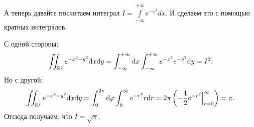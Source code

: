 \begin{Examples}
А теперь давайте посчитаем интеграл $I = \int\limits_{-\infty}^{+\infty} e^{-x^2}dx$. И сделаем это с помощью кратных интегралов.

С одной стороны:
$$
\iint_{\mathbb{R}^2} e^{-x^2 -y^2}\mathrm{d}x \mathrm{d} y = \int_{-\infty}^{+\infty}\mathrm{d}x \int_{-\infty}^{+\infty} e^{-x^2}e^{-y^2}\mathrm{d} y = I^2.
$$
Но с другой:
$$
\iint_{\mathbb{R}^2} e^{-x^2 -y^2}\mathrm{d}x \mathrm{d} y = \int_0^{2\pi}\mathrm{d} \varphi \int_0^\infty e^{-r^2}r\mathrm{d} r = 2\pi\left( -\dfrac{1}{2} e^{-r^2} \Big|_{r=0}^\infty \right) = \pi.
$$
Отсюда получаем, что $I = \sqrt{\pi}$.
\end{Examples}














